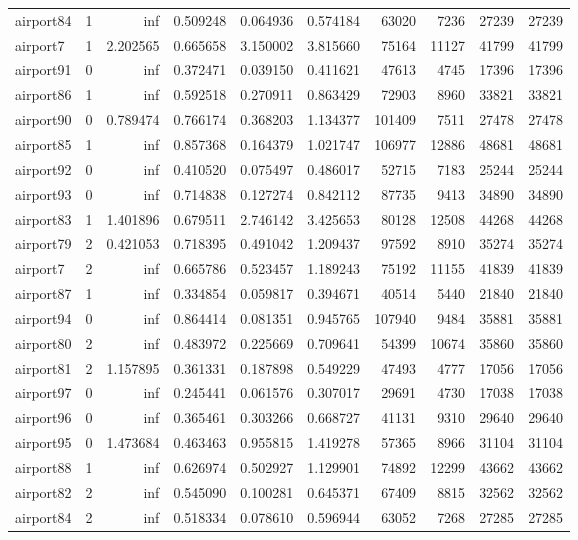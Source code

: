 \begin{longtable}{|l|r|r|r|r|r|r|r|r|r|}
airport84 & 1 & inf & 0.509248 & 0.064936 & 0.574184 & 63020 & 7236 & 27239 & 27239 \\
airport7 & 1 & 2.202565 & 0.665658 & 3.150002 & 3.815660 & 75164 & 11127 & 41799 & 41799 \\
airport91 & 0 & inf & 0.372471 & 0.039150 & 0.411621 & 47613 & 4745 & 17396 & 17396 \\
airport86 & 1 & inf & 0.592518 & 0.270911 & 0.863429 & 72903 & 8960 & 33821 & 33821 \\
airport90 & 0 & 0.789474 & 0.766174 & 0.368203 & 1.134377 & 101409 & 7511 & 27478 & 27478 \\
airport85 & 1 & inf & 0.857368 & 0.164379 & 1.021747 & 106977 & 12886 & 48681 & 48681 \\
airport92 & 0 & inf & 0.410520 & 0.075497 & 0.486017 & 52715 & 7183 & 25244 & 25244 \\
airport93 & 0 & inf & 0.714838 & 0.127274 & 0.842112 & 87735 & 9413 & 34890 & 34890 \\
airport83 & 1 & 1.401896 & 0.679511 & 2.746142 & 3.425653 & 80128 & 12508 & 44268 & 44268 \\
airport79 & 2 & 0.421053 & 0.718395 & 0.491042 & 1.209437 & 97592 & 8910 & 35274 & 35274 \\
airport7 & 2 & inf & 0.665786 & 0.523457 & 1.189243 & 75192 & 11155 & 41839 & 41839 \\
airport87 & 1 & inf & 0.334854 & 0.059817 & 0.394671 & 40514 & 5440 & 21840 & 21840 \\
airport94 & 0 & inf & 0.864414 & 0.081351 & 0.945765 & 107940 & 9484 & 35881 & 35881 \\
airport80 & 2 & inf & 0.483972 & 0.225669 & 0.709641 & 54399 & 10674 & 35860 & 35860 \\
airport81 & 2 & 1.157895 & 0.361331 & 0.187898 & 0.549229 & 47493 & 4777 & 17056 & 17056 \\
airport97 & 0 & inf & 0.245441 & 0.061576 & 0.307017 & 29691 & 4730 & 17038 & 17038 \\
airport96 & 0 & inf & 0.365461 & 0.303266 & 0.668727 & 41131 & 9310 & 29640 & 29640 \\
airport95 & 0 & 1.473684 & 0.463463 & 0.955815 & 1.419278 & 57365 & 8966 & 31104 & 31104 \\
airport88 & 1 & inf & 0.626974 & 0.502927 & 1.129901 & 74892 & 12299 & 43662 & 43662 \\
airport82 & 2 & inf & 0.545090 & 0.100281 & 0.645371 & 67409 & 8815 & 32562 & 32562 \\
airport84 & 2 & inf & 0.518334 & 0.078610 & 0.596944 & 63052 & 7268 & 27285 & 27285 \\

\end{longtable}
